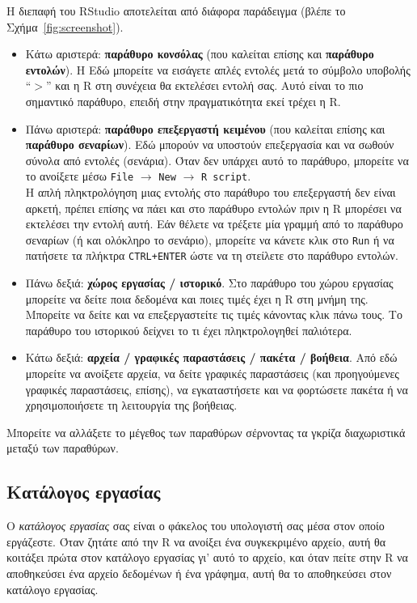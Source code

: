 \documentclass[a4paper,10pt,twocolumn]{article}
\begin{document}
Η διεπαφή του RStudio αποτελείται από διάφορα παράδειγμα (βλέπε το Σχήμα~\ref{fig:screenshot}).
\begin{itemize}
\item Κάτω αριστερά: \textbf{παράθυρο κονσόλας} (που καλείται επίσης και \textbf{παράθυρο εντολών}). H
Εδώ μπορείτε να εισάγετε απλές εντολές μετά το σύμβολο υποβολής ``$>$'' και η R στη συνέχεια θα εκτελέσει
εντολή σας. Αυτό είναι το πιο σημαντικό παράθυρο, επειδή στην πραγματικότητα εκεί τρέχει η R.
\item Πάνω αριστερά: \textbf{παράθυρο επεξεργαστή κειμένου} (που καλείται επίσης και
\textbf{παράθυρο σεναρίων}). Εδώ μπορούν να υποστούν επεξεργασία και να σωθούν σύνολα από εντολές (σενάρια).
Όταν δεν υπάρχει αυτό το παράθυρο, μπορείτε να το ανοίξετε μέσω \texttt{File} $\rightarrow$
\texttt{New} $\rightarrow$ \texttt{R script}.\\
Η απλή πληκτρολόγηση μιας εντολής στο παράθυρο του επεξεργαστή δεν είναι αρκετή, πρέπει επίσης να πάει και στο
παράθυρο εντολών πριν η R μπορέσει να εκτελέσει την εντολή αυτή. Εάν θέλετε να τρέξετε μία γραμμή από το 
παράθυρο σεναρίων (ή και ολόκληρο το σενάριο), μπορείτε να κάνετε κλικ στο \texttt{Run} ή να πατήσετε τα
πλήκτρα \texttt{CTRL+ENTER} ώστε να τη στείλετε στο παράθυρο εντολών. 
\item Πάνω δεξιά: \textbf{χώρος εργασίας / ιστορικό}. Στο παράθυρο του χώρου εργασίας
μπορείτε να δείτε ποια δεδομένα και ποιες τιμές έχει η R στη μνήμη της. Μπορείτε να δείτε και να επεξεργαστείτε
τις τιμές κάνοντας κλικ πάνω τους. Το παράθυρο του ιστορικού δείχνει το τι έχει πληκτρολογηθεί παλιότερα. 
\item Κάτω δεξιά: \textbf{αρχεία / γραφικές παραστάσεις / πακέτα / βοήθεια}. Από εδώ μπορείτε να ανοίξετε
αρχεία, να δείτε γραφικές παραστάσεις (και προηγούμενες γραφικές παραστάσεις, επίσης), να εγκαταστήσετε
και να φορτώσετε πακέτα ή να χρησιμοποιήσετε τη λειτουργία της βοήθειας.
\end{itemize}

Μπορείτε να αλλάξετε το μέγεθος των παραθύρων σέρνοντας τα γκρίζα διαχωριστικά μεταξύ των παραθύρων.

\subsection{Κατάλογος εργασίας}

Ο \emph{κατάλογος εργασίας} σας είναι ο φάκελος του υπολογιστή σας μέσα στον οποίο εργάζεστε. Όταν ζητάτε από
την R να ανοίξει ένα συγκεκριμένο αρχείο, αυτή θα κοιτάξει πρώτα στον κατάλογο εργασίας γι' αυτό το αρχείο, και
όταν πείτε στην R να αποθηκεύσει ένα αρχείο δεδομένων ή ένα γράφημα, αυτή θα το αποθηκεύσει στον κατάλογο
εργασίας.
\end{document}
